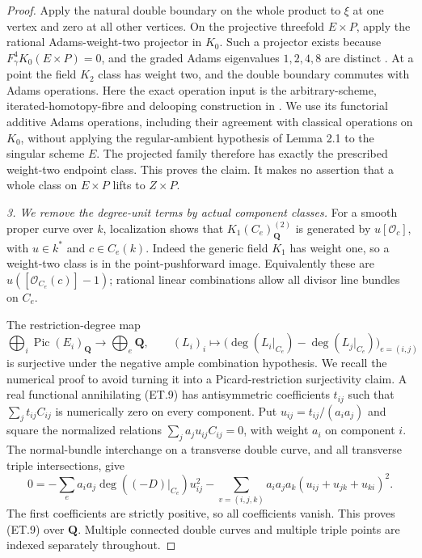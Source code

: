 \begin{proof}
Apply the natural double boundary on the whole product to $\xi$ at one
vertex and zero at all other vertices. On the projective threefold
$E\times P$, apply the rational Adams-weight-two projector in $K_0$.
Such a projector exists because $F_\gamma^4K_0(E\times P)=0$, and
the graded Adams eigenvalues $1,2,4,8$ are distinct
\citep[Chapter II, Proposition 4.9 and Remark 8.8.5]
{D_Weibel2013KbookII}. At a point the field $K_2$ class has weight two,
and the double boundary commutes with Adams operations. Here the exact
operation input is the arbitrary-scheme, iterated-homotopy-fibre and
delooping construction in \citet[p.~258, paragraph preceding Lemma 2.1]
{frC3bcLevine1994}. We use its functorial additive Adams operations,
including their agreement with classical operations on $K_0$, without
applying the regular-ambient hypothesis of Lemma 2.1 to the singular
scheme $E$. The projected
family therefore has exactly the prescribed weight-two endpoint class.
This proves the claim. It makes no assertion that a whole class on
$E\times P$ lifts to $Z\times P$.

\emph{3. We remove the degree-unit terms by actual component classes.}
For a smooth proper curve over $k$, localization shows that
$K_1(C_e)_{\mathbf Q}^{(2)}$ is generated by
$u[\mathcal O_c]$, with $u\in k^*$ and $c\in C_e(k)$.
Indeed the generic field $K_1$ has weight one, so a weight-two class is
in the point-pushforward image. Equivalently these are
$u([\mathcal O_{C_e}(c)]-1)$; rational linear combinations allow all
divisor line bundles on $C_e$.

The restriction-degree map
\begin{equation}
 \bigoplus_i\operatorname{Pic}(E_i)_{\mathbf Q}
   \longrightarrow\bigoplus_e\mathbf Q,
 \qquad (L_i)_i\longmapsto
       \bigl(\deg(L_i|_{C_e})-\deg(L_j|_{C_e})\bigr)_{e=(i,j)}
                                                        \tag{ET.9}
\end{equation}
is surjective under the negative ample combination hypothesis. We
recall the numerical proof to avoid turning it into a Picard-restriction
surjectivity claim. A real functional annihilating (ET.9) has
antisymmetric coefficients $t_{ij}$ such that
$\sum_jt_{ij}C_{ij}$ is numerically zero on every component.
Put $u_{ij}=t_{ij}/(a_i a_j)$ and square the normalized relations
$\sum_j a_j u_{ij}C_{ij}=0$, with weight $a_i$ on component $i$.
The normal-bundle interchange on
a transverse double curve, and all transverse triple intersections,
give
\[
 0=-\sum_ea_i a_j\deg((-D)|_{C_e})u_{ij}^2
   -\sum_{v=(i,j,k)}a_i a_j a_k
                          (u_{ij}+u_{jk}+u_{ki})^2.
\]
The first coefficients are strictly positive, so all coefficients
vanish. This proves (ET.9) over $\mathbf Q$. Multiple connected double
curves and multiple triple points are indexed separately throughout.


\end{proof}
